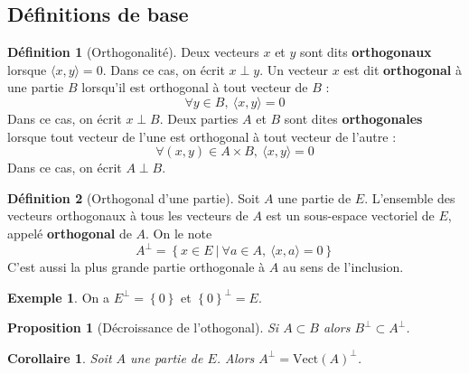 \documentclass[french]{article}
\newcommand{\vect}{\text{Vect}}
\theoremstyle{plain}
\newtheorem{prop}{Proposition}
\newtheorem{cor}{Corollaire}
\theoremstyle{definition}
\newtheorem{dfn}{Définition}
\newtheorem{exa}{Exemple}
\begin{document}
\subsection{Définitions de base}
\begin{dfn}[Orthogonalité]
	Deux vecteurs $x$ et $y$ sont dits \textbf{orthogonaux} lorsque $\langle x,y\rangle=0$. Dans ce cas, on écrit $x\perp y$. Un vecteur $x$ est dit \textbf{orthogonal} à une partie $B$ lorsqu'il est orthogonal à tout vecteur de $B$ : $$\forall y \in B, \ \langle x,y\rangle=0$$ Dans ce cas, on écrit $x\perp B$. Deux parties $A$ et $B$ sont dites \textbf{orthogonales} lorsque tout vecteur de l'une est orthogonal à tout vecteur de l'autre : $$\forall (x,y)\in A\times B,\ \langle x,y\rangle=0$$ Dans ce cas, on écrit $A\perp B$.
\end{dfn}
\begin{dfn}[Orthogonal d'une partie]
	Soit $A$ une partie de $E$. L'ensemble des vecteurs orthogonaux à tous les vecteurs de $A$ est un sous-espace vectoriel de $E$, appelé \textbf{orthogonal} de $A$. On le note $$A^\perp =\left\{x\in E \ | \ \forall a\in A, \ \langle x,a\rangle=0\right\}$$ C'est aussi la plus grande partie orthogonale à $A$ au sens de l'inclusion.
\end{dfn}
\begin{exa}
	On a $E^\perp=\left\{0\right\}$ et $\left\{0\right\}^\perp=E$.
\end{exa}
\begin{prop}[Décroissance de l'othogonal]
	Si $A\subset B$ alors $B^\perp\subset A^\perp$.
\end{prop}
\begin{cor}
	Soit $A$ une partie de $E$. Alors $A^\perp=\vect(A)^\perp$.
\end{cor}
\end{document}
